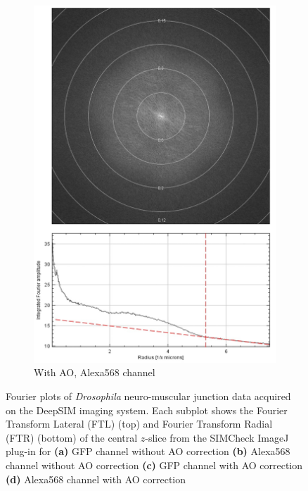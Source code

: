 \begin{figure}
\begin{subfigure}[t]{0.45\textwidth}
		\includegraphics[width=\linewidth]{images/DeepSIM_NMJ_AO_Alexa568_ft_and_plot.jpg}
		\caption{With AO, Alexa568 channel}
		\label{fig:DeepSIM_NMJ_AO_Alexa568_ft_and_plot}
	\end{subfigure}
	\caption[Fourier plots of \textit{Drosophila} neuro-muscular junction 
	data acquired on the DeepSIM imaging system]{Fourier plots of 
	\textit{Drosophila} neuro-muscular junction data acquired on the 
	DeepSIM imaging system. Each subplot shows the Fourier Transform 
	Lateral (FTL) (top) and Fourier	Transform Radial (FTR) (bottom) of the 
	central $z$-slice from the SIMCheck ImageJ 
	plug-in\cite{ball2015simcheck} for \textbf{(a)} GFP channel without AO 
	correction \textbf{(b)} Alexa568 channel without AO correction 
	\textbf{(c)} GFP channel with AO correction \textbf{(d)} Alexa568 
	channel with AO correction}
	\label{fig:NMJ_ft_data}
\end{figure}